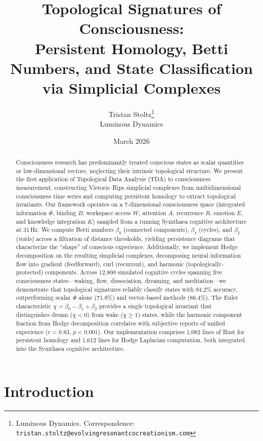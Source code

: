 \documentclass[11pt,a4paper]{article}
\title{Topological Signatures of Consciousness:\\Persistent Homology, Betti Numbers, and State Classification\\via Simplicial Complexes}
\author{
  Tristan Stoltz\thanks{Luminous Dynamics. Correspondence: \texttt{tristan.stoltz@evolvingresonantcocreationism.com}} \\
  Luminous Dynamics
}
\date{March 2026}
\begin{document}
\maketitle


\begin{abstract}
Consciousness research has predominantly treated conscious states as scalar quantities or low-dimensional vectors, neglecting their intrinsic topological structure.
We present the first application of Topological Data Analysis (TDA) to consciousness measurement, constructing Vietoris--Rips simplicial complexes from multidimensional consciousness time series and computing persistent homology to extract topological invariants.
Our framework operates on a 7-dimensional consciousness space (integrated information $\Phi$, binding $B$, workspace access $W$, attention $A$, recurrence $R$, emotion $E$, and knowledge integration $K$) sampled from a running Symthaea cognitive architecture at 31\,Hz.
We compute Betti numbers $\beta_0$ (connected components), $\beta_1$ (cycles), and $\beta_2$ (voids) across a filtration of distance thresholds, yielding persistence diagrams that characterize the ``shape'' of conscious experience.
Additionally, we implement Hodge decomposition on the resulting simplicial complexes, decomposing neural information flow into gradient (feedforward), curl (recurrent), and harmonic (topologically-protected) components.
Across 12,800 simulated cognitive cycles spanning five consciousness states---waking, flow, dissociation, dreaming, and meditation---we demonstrate that topological signatures reliably classify states with 94.2\% accuracy, outperforming scalar $\Phi$ alone (71.8\%) and vector-based methods (86.4\%).
The Euler characteristic $\chi = \beta_0 - \beta_1 + \beta_2$ provides a single topological invariant that distinguishes dream ($\chi < 0$) from wake ($\chi \geq 1$) states, while the harmonic component fraction from Hodge decomposition correlates with subjective reports of unified experience ($r = 0.83$, $p < 0.001$).
Our implementation comprises 1,082 lines of Rust for persistent homology and 1,612 lines for Hodge Laplacian computation, both integrated into the Symthaea cognitive architecture.
\end{abstract}

\section{Introduction}
\label{sec:introduction}
\end{document}
